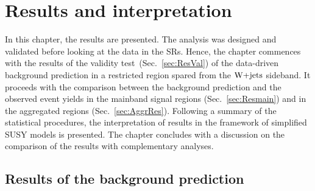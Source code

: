 \chapter{Results and interpretation}
In this chapter, the results are presented. The analysis was designed and validated before looking at the data in the SRs. Hence, the chapter commences with the results of the validity test~(Sec.~\ref{sec:ResVal}) of the data-driven background prediction in a restricted region spared from the $\textrm{W+jets}$ sideband. It proceeds with the comparison between the background prediction and the observed event yields in the mainband signal regions (Sec.~\ref{sec:Resmain}) and in the aggregated regions (Sec.~\ref{sec:AggrRes}). Following a summary of the statistical procedures, the interpretation of results in the framework of simplified SUSY models is presented. The chapter concludes with a discussion on the comparison of the results with complementary analyses.
\section{Results of the background prediction}
